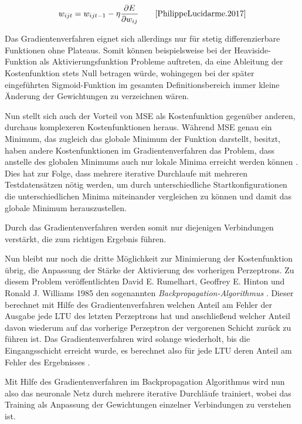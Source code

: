 \begin{equation} \label{gradientenverfahren}
w_{ijt} = w_{ijt-1} - \eta\frac{\partial E}{\partial w_{ij}} \qquad\text{\cite{PhilippeLucidarme.2017}} 
\end{equation}

Das Gradientenverfahren eignet sich allerdings nur für stetig differenzierbare Funktionen ohne Plateaus. Somit können beispielsweise bei der Heaviside-Funktion als Aktivierungsfunktion Probleme auftreten, da eine Ableitung der Kostenfunktion stets Null betragen würde, wohingegen bei der später eingeführten Sigmoid-Funktion im gesamten Definitionsbereich immer kleine Änderung der Gewichtungen zu verzeichnen wären. \cite[S. 262]{AurelienGeron.2018}

Nun stellt sich auch der Vorteil von MSE als Kostenfunktion gegenüber anderen, durchaus komplexeren Kostenfunktionen heraus. Während MSE genau ein Minimum, das zugleich das globale Minimum der Funktion darstellt, besitzt, haben andere Kostenfunktionen im Gradientenverfahren das Problem, dass anstelle des globalen Minimums auch nur lokale Minima erreicht werden können \cite[S. 114 f.]{AurelienGeron.2018}. Dies hat zur Folge, dass mehrere iterative Durchlaufe mit mehreren Testdatensätzen nötig werden, um durch unterschiedliche Startkonfigurationen die unterschiedlichen Minima miteinander vergleichen zu können und damit das globale Minimum herauszustellen.

Durch das Gradientenverfahren werden somit nur diejenigen Verbindungen verstärkt, die zum richtigen Ergebnis führen. 

Nun bleibt nur noch die dritte Möglichkeit zur Minimierung der Kostenfunktion übrig, die Anpassung der Stärke der Aktivierung des vorherigen Perzeptrons. Zu diesem Problem veröffentlichten David E. Rumelhart, Geoffrey E. Hinton und Ronald J. Williams 1985 den sogenannten \textit{Backpropagation-Algorithmus} \cite{DavidE.Rumelhart.September1985}. Dieser berechnet mit Hilfe des Gradientenverfahren welchen Anteil am Fehler der Ausgabe jede LTU des letzten Perzeptrons hat und anschließend welcher Anteil davon wiederum auf das vorherige Perzeptron der vergorenen Schicht zurück zu führen ist. Das Gradientenverfahren wird solange wiederholt, bis die Eingangsschicht erreicht wurde, es berechnet also für jede LTU deren Anteil am Fehler des Ergebnisses \cite[S. 261 f.]{AurelienGeron.2018}.

Mit Hilfe des Gradientenverfahren im Backpropagation Algorithmus wird nun also das neuronale Netz durch mehrere iterative Durchläufe trainiert, wobei das Training als Anpassung der Gewichtungen einzelner Verbindungen zu verstehen ist.